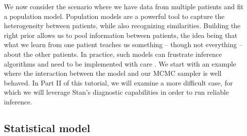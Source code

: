 
We now consider the scenario where we have data from multiple patients and fit a population model.
Population models are a powerful tool to capture the heterogeneity between patients, while also recognizing similarities.
Building the right prior allows us to pool information between patients, the idea being that what we learn from one patient teaches us something -- though not everything -- about the other patients.
In practice, such models can frustrate inference algorithms and need to be implemented with care \cite[e.g.][]{Betancourt:2013}.
We start with an example where the interaction between the model and our MCMC sampler is well behaved.
In Part II of this tutorial, we will examine a more difficult case, for which we will leverage Stan's diagnostic capabilities in order to run reliable inference.

\subsection{Statistical model} \label{sec:twoCptPop_stat}

